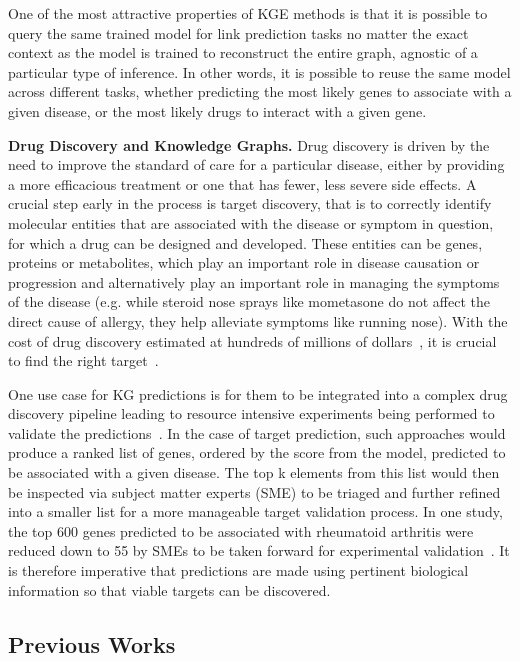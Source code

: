One of the most attractive properties of KGE methods is that it is possible to query the same trained model for link prediction tasks no matter the exact context as the model is trained to reconstruct the entire graph, agnostic of a particular type of inference. In other words, it is possible to reuse the same model across different tasks, whether predicting the most likely genes to associate with a given disease, or the most likely drugs to interact with a given gene.

\textbf{Drug Discovery and Knowledge Graphs.} Drug discovery is driven by the need to improve the standard of care for a particular disease, either by providing a more efficacious treatment or one that has fewer, less severe side effects. A crucial step early in the process is target discovery, that is to correctly identify molecular entities that are associated with the disease or symptom in question, for which a drug can be designed and developed. These entities can be genes, proteins or metabolites, which play an important role in disease causation or progression and alternatively play an important role in managing the symptoms of the disease (e.g. while steroid nose sprays like mometasone do not affect the direct cause of allergy, they help alleviate symptoms like running nose). With the cost of drug discovery estimated at hundreds of millions of dollars~\cite{wouters2020drugdisco}, it is crucial to find the right target~\cite{morgan2018impact}.

One use case for KG predictions is for them to be integrated into a complex drug discovery pipeline leading to resource intensive experiments being performed to validate the predictions~\cite{paliwal2020preclinical}. In the case of target prediction, such approaches would produce a ranked list of genes, ordered by the score from the model, predicted to be associated with a given disease. The top k elements from this list would then be inspected via subject matter experts (SME) to be triaged and further refined into a smaller list for a more manageable target validation process. In one study, the top 600 genes predicted to be associated with rheumatoid arthritis were reduced down to 55 by SMEs to be taken forward for experimental validation~\cite{paliwal2020preclinical}. It is therefore imperative that predictions are made using pertinent biological information so that viable targets can be discovered.

\subsection{Previous Works}


